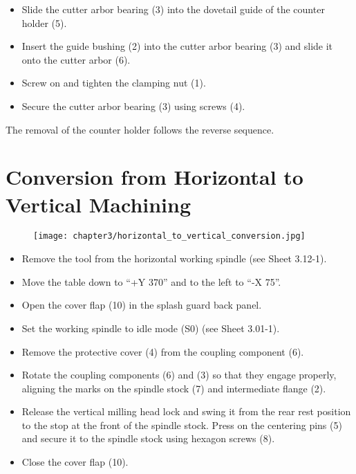 
\begin{itemize}
    \item Slide the cutter arbor bearing (3) into the dovetail guide of the counter holder (5).
    \item Insert the guide bushing (2) into the cutter arbor bearing (3) and slide it onto the cutter arbor (6).
    \item Screw on and tighten the clamping nut (1).
    \item Secure the cutter arbor bearing (3) using screws (4).
\end{itemize}

\noindent The removal of the counter holder follows the reverse sequence.\footnotemark

\vspace{0.3cm}


\section{Conversion from Horizontal to Vertical Machining}
\setcounter{section}{7}

\begin{figure}[h]
    \centering
    \texttt{[image: chapter3/horizontal\_to\_vertical\_conversion.jpg]}
    \label{fig:horizontal_to_vertical_conversion}
\end{figure}

\vspace{0.3cm}

\begin{itemize}
    \item Remove the tool from the horizontal working spindle (see Sheet 3.12-1).
    \item Move the table down to \enquote{+Y 370} and to the left to \enquote{-X 75}.\footnotemark
    \item Open the cover flap (10) in the splash guard back panel.
    \item Set the working spindle to idle mode (S0) (see Sheet 3.01-1).
    \item Remove the protective cover (4) from the coupling component (6).
    \item Rotate the coupling components (6) and (3) so that they engage properly, aligning the marks on the spindle stock (7) and intermediate flange (2).
    \item Release the vertical milling head lock and swing it from the rear rest position to the stop at the front of the spindle stock. Press on the centering pins (5) and secure it to the spindle stock using hexagon screws (8).
    \item Close the cover flap (10).
\end{itemize}

